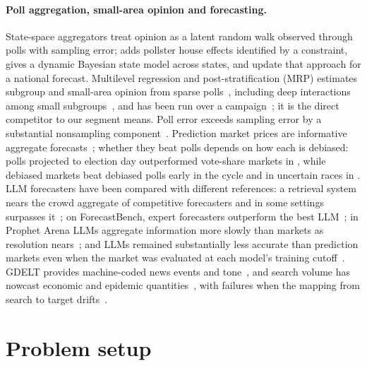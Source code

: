 \documentclass[10pt]{article}
\theoremstyle{remark}
\begin{document}
\paragraph{Poll aggregation, small-area opinion and forecasting.} State-space aggregators treat opinion as a latent random walk observed through polls with sampling error; \citet{jackman2005} adds pollster house effects identified by a constraint, \citet{linzer2013} gives a dynamic Bayesian state model across states, and \citet{heidemanns2020} update that approach for a national forecast. Multilevel regression and post-stratification (MRP) estimates subgroup and small-area opinion from sparse polls~\cite{park2004mrp}, including deep interactions among small subgroups~\cite{ghitza2013}, and has been run over a campaign~\cite{wang2015xbox}; it is the direct competitor to our segment means. Poll error exceeds sampling error by a substantial nonsampling component~\cite{shiranimehr2018}. Prediction market prices are informative aggregate forecasts~\cite{wolfers2004}; whether they beat polls depends on how each is debiased: polls projected to election day outperformed vote-share markets in \citet{erikson2008}, while debiased markets beat debiased polls early in the cycle and in uncertain races in \citet{rothschild2009}. LLM forecasters have been compared with different references: a retrieval system nears the crowd aggregate of competitive forecasters and in some settings surpasses it~\cite{halawi2024}; on ForecastBench, expert forecasters outperform the best LLM~\cite{karger2024}; in Prophet Arena LLMs aggregate information more slowly than markets as resolution nears~\cite{yang2025prophet}; and LLMs remained substantially less accurate than prediction markets even when the market was evaluated at each model's training cutoff~\cite{douven2026}. GDELT provides machine-coded news events and tone~\cite{leetaru2013}, and search volume has nowcast economic and epidemic quantities~\cite{choi2012,ginsberg2009}, with failures when the mapping from search to target drifts~\cite{lazer2014}.

\section{Problem setup}
\label{sec:setup}
\end{document}
